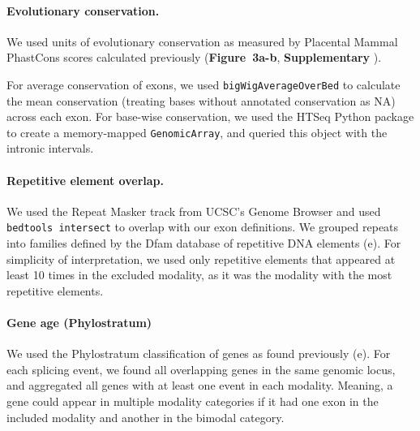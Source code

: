 \paragraph{Evolutionary conservation.} We used units of evolutionary conservation as measured by Placental Mammal PhastCons \cite{Siepel:2005cu} scores calculated previously \cite{Lovci2013-fr} (\textbf{Figure~3a-b}, \textbf{Supplementary }).

For average conservation of exons, we used \texttt{bigWigAverageOverBed} \cite{Kent:2010ff} to calculate the mean conservation (treating bases without annotated conservation as NA) across each exon. For base-wise conservation, we used the HTSeq \cite{Anders:2015gf} Python package to create a memory-mapped \texttt{GenomicArray}, and queried this object with the intronic intervals.


\paragraph{Repetitive element overlap.} We used the Repeat Masker track\cite{Rosenbloom:2015bg} from UCSC's Genome Browser\cite{Kent:2002jd} and used \texttt{bedtools intersect}\cite{Quinlan:2010kma} to overlap with our exon definitions. We grouped repeats into families defined by the Dfam \cite{Hubley:2016fu} database of repetitive DNA elements (e). For simplicity of interpretation, we used only repetitive elements that appeared at least 10 times in the excluded modality, as it was the modality with the most repetitive elements.

\paragraph{Gene age (Phylostratum)}

We used the Phylostratum classification of genes as found previously\cite{DomazetLoso:2008ba} (e). For each splicing event, we found all overlapping genes in the same genomic locus, and aggregated all genes with at least one event in each modality. Meaning, a gene could appear in multiple modality categories if it had one exon in the included modality and another in the bimodal category.


